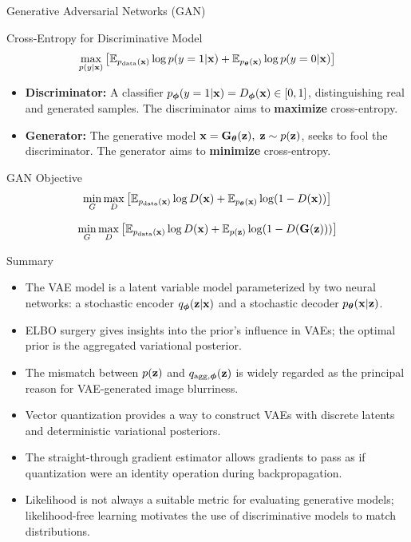 \documentclass{beamer}
\renewcommand{\eqpause}{}
\begin{document}
\begin{frame}{Generative Adversarial Networks (GAN)}
	\begin{block}{Cross-Entropy for Discriminative Model}
		\vspace{-0.3cm}
		\[
			\max_{p(y | \mathbf{x})} \left[\mathbb{E}_{p_{\text{data}}(\mathbf{x})} \log p(y = 1 | \mathbf{x}) + \mathbb{E}_{p_{\boldsymbol{\theta}}(\mathbf{x})} \log p(y = 0 | \mathbf{x}) \right] 
		\]
	\end{block}
	\eqpause
	\begin{itemize}
		\item \textbf{Discriminator:} A classifier $p_{\boldsymbol{\phi}}(y = 1 | \mathbf{x}) = D_{\boldsymbol{\phi}}(\mathbf{x}) \in [0, 1]$, distinguishing real and generated samples. The discriminator aims to \textbf{maximize} cross-entropy.
		\item \textbf{Generator:} The generative model $\mathbf{x} = \mathbf{G}_{\boldsymbol{\theta}}(\mathbf{z}),\; \mathbf{z} \sim p(\mathbf{z})$, seeks to fool the discriminator. The generator aims to \textbf{minimize} cross-entropy.
	\end{itemize}
	\eqpause
	\begin{block}{GAN Objective}
		\vspace{-0.5cm}
		\[
			\min_{G} \max_D \left[ \mathbb{E}_{p_{\text{data}}(\mathbf{x})} \log D(\mathbf{x}) + \mathbb{E}_{p_{\boldsymbol{\theta}}(\mathbf{x})} \log (1 - D(\mathbf{x})) \right] 
		\]
		\eqpause
		\[
			\min_{G} \max_D \left[ \mathbb{E}_{p_{\text{data}}(\mathbf{x})} \log D(\mathbf{x}) + \mathbb{E}_{p(\mathbf{z})} \log (1 - D(\mathbf{G}(\mathbf{z}))) \right]
		\]
	\end{block}
\end{frame}
\begin{frame}{Summary}
	\begin{itemize}
		\item The VAE model is a latent variable model parameterized by two neural networks: a stochastic encoder $q_{\boldsymbol{\phi}}(\mathbf{z}| \mathbf{x})$ and a stochastic decoder $p_{\boldsymbol{\theta}}(\mathbf{x} | \mathbf{z})$.
		\vfill
		\item ELBO surgery gives insights into the prior's influence in VAEs; the optimal prior is the aggregated variational posterior.
		\vfill
		\item The mismatch between $p(\mathbf{z})$ and $q_{\text{agg}, \boldsymbol{\phi}}(\mathbf{z})$ is widely regarded as the principal reason for VAE-generated image blurriness.		
		\vfill
		\item Vector quantization provides a way to construct VAEs with discrete latents and deterministic variational posteriors.
		\vfill
		\item The straight-through gradient estimator allows gradients to pass as if quantization were an identity operation during backpropagation.			
		\vfill
		\item Likelihood is not always a suitable metric for evaluating generative models; likelihood-free learning motivates the use of discriminative models to match distributions.
	\end{itemize}
\end{frame}
\end{document}
